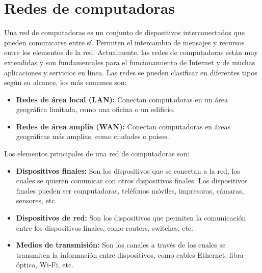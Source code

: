 \section{Redes de computadoras}
Una red de computadoras es un conjunto de dispositivos interconectados que pueden comunicarse entre sí. Permiten el intercambio de mensajes y recursos entre los elementos de la red. Actualmente, las redes de computadoras están muy extendidas y son fundamentales para el funcionamiento de Internet y de muchas aplicaciones y servicios en línea.
Las redes se pueden clasificar en diferentes tipos según su alcance, los más comunes son:
\begin{itemize}
	\item \textbf{Redes de área local (LAN):} Conectan computadoras en un área geográfica limitada, como una oficina o un edificio.
	\item \textbf{Redes de área amplia (WAN):} Conectan computadoras en áreas geográficas más amplias, como ciudades o países.
\end{itemize}

Los elementos principales de una red de computadoras son:
\begin{itemize}
	\item \textbf{Dispositivos finales:} Son los dispositivos que se conectan a la red, los cuales se quieren comunicar con otros dispositivos finales. Los dispositivos finales pueden ser computadoras, teléfonos móviles, impresoras, cámaras, sensores, etc.
	\item \textbf{Dispositivos de red:} Son los dispositivos que permiten la comunicación entre los dispositivos finales, como routers, switches, etc.
	\item \textbf{Medios de transmisión:} Son los canales a través de los cuales se transmiten la información entre dispositivos, como cables Ethernet, fibra óptica, Wi-Fi, etc.
\end{itemize}

